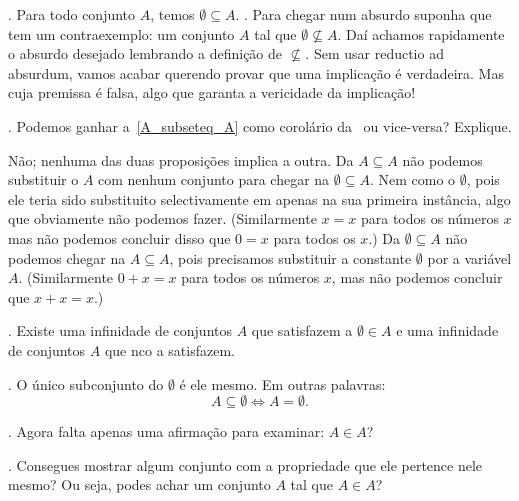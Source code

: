 \proposition.
\label{emptyset_subseteq_A}%
Para todo conjunto $A$, temos $\emptyset \subseteq A$.
\sketch.
Para chegar num absurdo suponha que tem um contraexemplo: um conjunto $A$ tal que $\emptyset\nsubseteq A$.
Daí achamos rapidamente o absurdo desejado lembrando a definição de $\nsubseteq$.
Sem usar reductio ad absurdum, vamos acabar querendo provar que uma implicação é verdadeira.
Mas cuja premissa é falsa, algo que garanta a vericidade da implicação!
\qes

\exercise.
\label{emptyset_subseteq_A_does_not_imply_A_subseteq_A_and_vv}%
Podemos ganhar a~\ref{A_subseteq_A} como corolário da~
ou vice-versa?  Explique.

\solution
Não; nenhuma das duas proposições implica a outra.
Da $A\subseteq A$ não podemos substituir o $A$ com nenhum conjunto para chegar na $\emptyset\subseteq A$.
Nem como o $\emptyset$, pois ele teria sido substituito selectivamente em apenas na sua primeira instância, algo que obviamente não podemos fazer.
(Similarmente $x = x$ para todos os números $x$ mas não podemos concluir disso que $0 = x$ para todos os $x$.)
Da $\emptyset\subseteq A$ não podemos chegar na $A \subseteq A$, pois precisamos substituir a constante $\emptyset$ por a variável $A$.
(Similarmente $0 + x = x$ para todos os números $x$, mas não podemos concluir que $x + x = x$.)

\endexercise

\proposition.
\label{emptyset_in_A_sometimes}%
Existe uma infinidade de conjuntos $A$ que satisfazem a $\emptyset \in A$
e uma infinidade de conjuntos $A$ que nco a satisfazem.

\proposition.
\label{A_subseteq_emptyset_iff_A_eq_emptyset}%
O único subconjunto do $\emptyset$ é ele mesmo.
Em outras palavras:
$$
A \subseteq \emptyset
\iff
A = \emptyset.
$$

\blah.
Agora falta apenas uma afirmação para examinar: $A \in A$?

\exercise.
\label{can_you_find_an_irregular_set}%
Consegues mostrar algum conjunto com a propriedade que ele pertence nele mesmo?
Ou seja, podes achar um conjunto $A$ tal que $A\in A$?

\endexercise

\endsection

